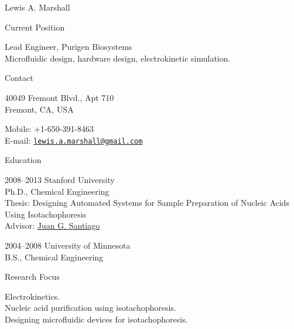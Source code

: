 \documentclass{article}
\begin{document}
\begin{cv}{Lewis A. Marshall}
  \begin{cvlist}{Current Position}
    \item Lead Engineer, Purigen Biosystems\\
      Microfluidic design, hardware design, electrokinetic simulation.
  \end{cvlist}

  \begin{cvlist}{Contact}
    \item 40049 Fremont Blvd., Apt 710\\
      Fremont, CA, USA
    \item Mobile: +1-650-391-8463\\
      E-mail: \texttt{\href{mailto:lewis.a.marshall@gmail.com}{lewis.a.marshall@gmail.com}}
  \end{cvlist}


  \begin{cvlist}{Education}
    \item[2008--2013] Stanford University\\
      Ph.D., Chemical Engineering\\
      Thesis: Designing Automated Systems for Sample Preparation of Nucleic Acids Using Isotachophoresis\\
      Advisor: \href{http://microfluidics.stanford.edu}{Juan G. Santiago}
    \item[2004--2008] University of Minnesota\\
      B.S., Chemical Engineering\\
  \end{cvlist}

\begin{cvlist}{Research Focus}
  \item Electrokinetics.\\
    Nucleic acid purification using isotachophoresis.\\
    Designing microfluidic devices for isotachophoresis.\\
\end{cvlist}


\setlength{\cvlabelwidth}{1em}
\renewcommand*{\bibindent}{1.5em}


\end{cv}
\end{document}
